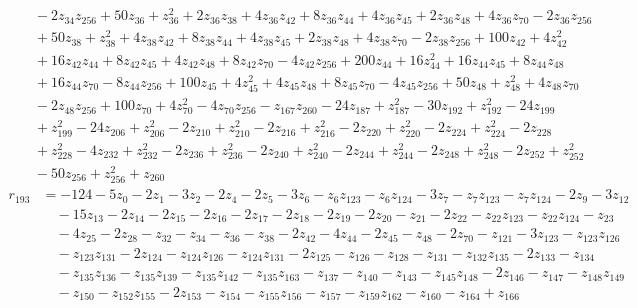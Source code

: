 \begin{align*}
&\quad  - 2z_{34}z_{256} + 50z_{36} + z_{36}^{2} + 2z_{36}z_{38} + 4z_{36}z_{42} + 8z_{36}z_{44} + 4z_{36}z_{45} + 2z_{36}z_{48} + 4z_{36}z_{70} - 2z_{36}z_{256} \\
&\quad  + 50z_{38} + z_{38}^{2} + 4z_{38}z_{42} + 8z_{38}z_{44} + 4z_{38}z_{45} + 2z_{38}z_{48} + 4z_{38}z_{70} - 2z_{38}z_{256} + 100z_{42} + 4z_{42}^{2} \\
&\quad  + 16z_{42}z_{44} + 8z_{42}z_{45} + 4z_{42}z_{48} + 8z_{42}z_{70} - 4z_{42}z_{256} + 200z_{44} + 16z_{44}^{2} + 16z_{44}z_{45} + 8z_{44}z_{48} \\
&\quad  + 16z_{44}z_{70} - 8z_{44}z_{256} + 100z_{45} + 4z_{45}^{2} + 4z_{45}z_{48} + 8z_{45}z_{70} - 4z_{45}z_{256} + 50z_{48} + z_{48}^{2} + 4z_{48}z_{70} \\
&\quad  - 2z_{48}z_{256} + 100z_{70} + 4z_{70}^{2} - 4z_{70}z_{256} - z_{167}z_{260} - 24z_{187} + z_{187}^{2} - 30z_{192} + z_{192}^{2} - 24z_{199} \\
&\quad  + z_{199}^{2} - 24z_{206} + z_{206}^{2} - 2z_{210} + z_{210}^{2} - 2z_{216} + z_{216}^{2} - 2z_{220} + z_{220}^{2} - 2z_{224} + z_{224}^{2} - 2z_{228} \\
&\quad  + z_{228}^{2} - 4z_{232} + z_{232}^{2} - 2z_{236} + z_{236}^{2} - 2z_{240} + z_{240}^{2} - 2z_{244} + z_{244}^{2} - 2z_{248} + z_{248}^{2} - 2z_{252} + z_{252}^{2} \\
&\quad  - 50z_{256} + z_{256}^{2} + z_{260}
\end{align*}
\begin{align*}
r_{193} &= -124 - 5z_{0} - 2z_{1} - 3z_{2} - 2z_{4} - 2z_{5} - 3z_{6} - z_{6}z_{123} - z_{6}z_{124} - 3z_{7} - z_{7}z_{123} - z_{7}z_{124} - 2z_{9} - 3z_{12} \\
&\quad  - 15z_{13} - 2z_{14} - 2z_{15} - 2z_{16} - 2z_{17} - 2z_{18} - 2z_{19} - 2z_{20} - z_{21} - 2z_{22} - z_{22}z_{123} - z_{22}z_{124} - z_{23} \\
&\quad  - 4z_{25} - 2z_{28} - z_{32} - z_{34} - z_{36} - z_{38} - 2z_{42} - 4z_{44} - 2z_{45} - z_{48} - 2z_{70} - z_{121} - 3z_{123} - z_{123}z_{126} \\
&\quad  - z_{123}z_{131} - 2z_{124} - z_{124}z_{126} - z_{124}z_{131} - 2z_{125} - z_{126} - z_{128} - z_{131} - z_{132}z_{135} - 2z_{133} - z_{134} \\
&\quad  - z_{135}z_{136} - z_{135}z_{139} - z_{135}z_{142} - z_{135}z_{163} - z_{137} - z_{140} - z_{143} - z_{145}z_{148} - 2z_{146} - z_{147} - z_{148}z_{149} \\
&\quad  - z_{150} - z_{152}z_{155} - 2z_{153} - z_{154} - z_{155}z_{156} - z_{157} - z_{159}z_{162} - z_{160} - z_{164} + z_{166}
\end{align*}
